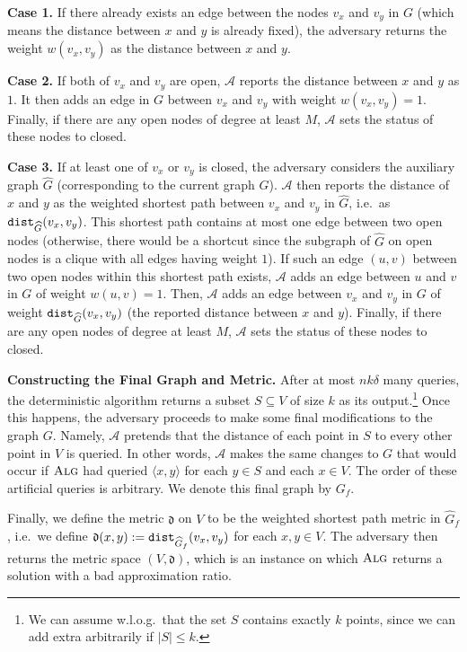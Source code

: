 \documentclass[11pt]{article}
\newcommand{\1}{\mathmybb{1}}
\newcommand{\A}{\textsc{Alg}}
\newcommand{\dist}{\textnormal{\texttt{dist}}}
\newcommand{\adv}[0]{\mathcal{A}}
\begin{document}
\medskip
\noindent
\textbf{Case 1.}
If there already exists an edge between the nodes $v_x$ and $v_y$ in $G$ (which means the distance between $x$ and $y$ is already fixed), the adversary returns the weight $w(v_x, v_y)$ as the distance between $x$ and $y$.

\medskip
\noindent
\textbf{Case 2.}
If both of $v_x$ and $v_y$ are open, $\adv$ reports the distance between $x$ and $y$ as $1$.
It then adds an edge in $G$ between $v_x$ and $v_y$ with weight $w(v_x,v_y) = 1$.
Finally, if there are any open nodes of degree at least $M$, $\adv$ sets the status of these nodes to closed.

\medskip
\noindent
\textbf{Case 3.}
If at least one of $v_x$ or $v_y$ is closed, the adversary considers the auxiliary graph $\widehat G$ (corresponding to the current graph $G$).
$\adv$ then reports the distance of $x$ and $y$ as the weighted shortest path between $v_x$ and $v_y$ in $\widehat G$, i.e.~as $\dist_{\widehat G}(v_x,v_y)$.
This shortest path contains at most one edge between two open nodes (otherwise, there would be a shortcut since the subgraph of $\widehat G$ on open nodes is a clique with all edges having weight $1$).
If such an edge $(u,v)$ between two open nodes within this shortest path exists, $\adv$ adds an edge between $u$ and $v$ in $G$ of weight $w(u,v) = 1$.
Then, $\adv$ adds an edge between $v_x$ and $v_y$ in $G$ of weight $\dist_{\widehat G}(v_x,v_y)$ (the reported distance between $x$ and $y$).
Finally, if there are any open nodes of degree at least $M$, $\adv$ sets the status of these nodes to closed.


\medskip
\noindent
\textbf{Constructing the Final Graph and Metric.}
After at most $nk\delta$ many queries, the deterministic algorithm returns a subset $S \subseteq V$ of size $k$ as its output.\footnote{We can assume w.l.o.g.~that the set $S$ contains exactly $k$ points, since we can add extra arbitrarily if $|S| \leq k$.}
Once this happens, the adversary proceeds to make some final modifications to the graph $G$.
Namely, $\adv$ pretends that the distance of each point in $S$ to every other point in $V$ is queried.
In other words, $\adv$ makes the same changes to $G$ that would occur if $\A$ had queried $\langle x, y \rangle$ for each $y \in S$ and each $x \in V$.
The order of these artificial queries is arbitrary.
We denote this final graph by $G_{f}$.

Finally, we define the metric $\mathfrak d$ on $V$ to be the weighted shortest path metric in $\widehat G_f$, i.e.~we define $\mathfrak d(x,y) := \dist_{\widehat G_f}(v_x,v_y)$ for each $x,y \in V$. The adversary then returns the metric space $(V, \mathfrak d)$, which is an instance on which $\A$ returns a solution with a bad approximation ratio.
\end{document}
